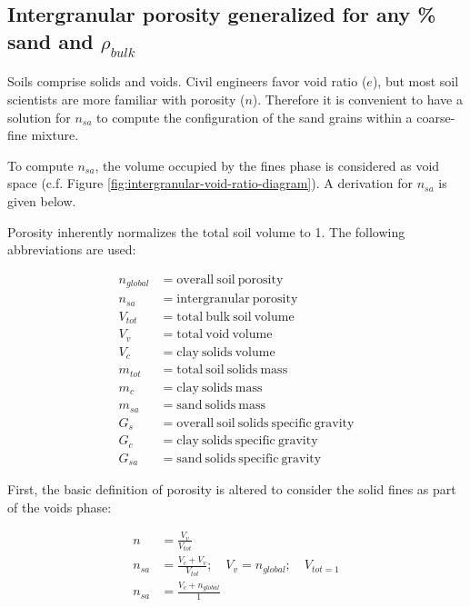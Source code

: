 \documentclass[
  letterpaper,
  openany]{book}
\begin{document}
\hypertarget{generalized-intergranular-porosity-equation}{%
\subsection{\texorpdfstring{Intergranular porosity generalized for any \% sand and \(\rho_{bulk}\)}{Intergranular porosity generalized for any \% sand and \textbackslash rho\_\{bulk\}}}\label{generalized-intergranular-porosity-equation}}

Soils comprise solids and voids.
Civil engineers favor void ratio (\(e\)), but most soil scientists are more familiar with porosity (\(n\)).
Therefore it is convenient to have a solution for \(n_{sa}\) to compute the configuration of the sand grains within a coarse-fine mixture.

To compute \(n_{sa}\), the volume occupied by the fines phase is considered as void space (c.f. Figure \ref{fig:intergranular-void-ratio-diagram}).
A derivation for \(n_{sa}\) is given below.

Porosity inherently normalizes the total soil volume to 1.
The following abbreviations are used:

\begin{align*}
n_{global} &= \mathrm{overall~soil~porosity} \\
n_{sa} &= \mathrm{intergranular~porosity} \\
V_{tot} &= \mathrm{total~bulk~soil~volume} \\
V_v &= \mathrm{total~void~volume} \\
V_c &= \mathrm{clay~solids~volume} \\
m_{tot} &= \mathrm{total~soil~solids~mass} \\
m_c &= \mathrm{clay~solids~mass} \\
m_{sa} &= \mathrm{sand~solids~mass} \\
G_{s} &= \mathrm{overall~soil~solids~specific~gravity} \\
G_{c} &= \mathrm{clay~solids~specific~gravity} \\
G_{sa} &= \mathrm{sand~solids~specific~gravity}
\end{align*}

First, the basic definition of porosity is altered to consider the solid fines as part of the voids phase:

\begin{align}
n &= \frac{V_{v}}{V_{tot}} \\
n_{sa}& = \frac{V_c + V_v}{V_{tot}} ; \quad V_v = n_{global}; \quad V_{tot = 1} \label{eq:intergranular-porosity-volume-is-1}\\
n_{sa}& = \frac{V_c+n_{global}}{1} 
\label{eq:basic-intergranular-porosity-equation}
\end{align}
\end{document}
